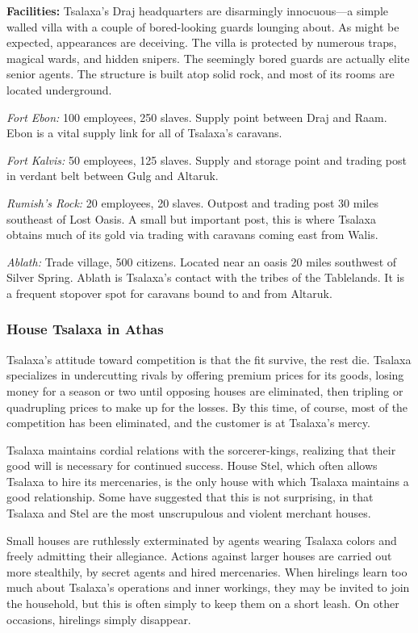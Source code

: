 \textbf{Facilities:} Tsalaxa's Draj headquarters are disarmingly innocuous---a simple walled villa with a couple of bored-looking guards lounging about. As might be expected, appearances are deceiving. The villa is protected by numerous traps, magical wards, and hidden snipers. The seemingly bored guards are actually elite senior agents. The structure is built atop solid rock, and most of its rooms are located underground.

\textit{Fort Ebon:} 100 employees, 250 slaves. Supply point between Draj and Raam. Ebon is a vital supply link for all of Tsalaxa's caravans.

\textit{Fort Kalvis:} 50 employees, 125 slaves. Supply and storage point and trading post in verdant belt between Gulg and Altaruk.

\textit{Rumish's Rock:} 20 employees, 20 slaves. Outpost and trading post 30 miles southeast of Lost Oasis. A small but important post, this is where Tsalaxa obtains much of its gold via trading with caravans coming east from Walis.

\textit{Ablath:} Trade village, 500 citizens. Located near an oasis 20 miles southwest of Silver Spring. Ablath is Tsalaxa's contact with the tribes of the Tablelands. It is a frequent stopover spot for caravans bound to and from Altaruk.

\subsubsection{House Tsalaxa in Athas}
Tsalaxa's attitude toward competition is that the fit survive, the rest die. Tsalaxa specializes in undercutting rivals by offering premium prices for its goods, losing money for a season or two until opposing houses are eliminated, then tripling or quadrupling prices to make up for the losses. By this time, of course, most of the competition has been eliminated, and the customer is at Tsalaxa's mercy.

Tsalaxa maintains cordial relations with the sorcerer-kings, realizing that their good will is necessary for continued success. House Stel, which often allows Tsalaxa to hire its mercenaries, is the only house with which Tsalaxa maintains a good relationship. Some have suggested that this is not surprising, in that Tsalaxa and Stel are the most unscrupulous and violent merchant houses.

Small houses are ruthlessly exterminated by agents wearing Tsalaxa colors and freely admitting their allegiance. Actions against larger houses are carried out more stealthily, by secret agents and hired mercenaries. When hirelings learn too much about Tsalaxa's operations and inner workings, they may be invited to join the household, but this is often simply to keep them on a short leash. On other occasions, hirelings simply disappear.

